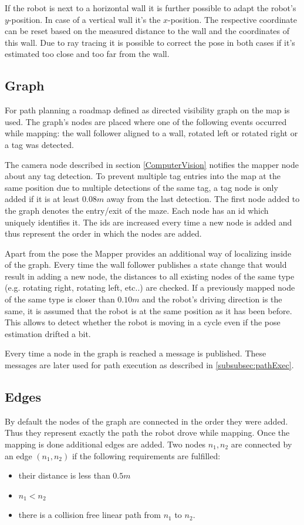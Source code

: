 If the robot is next to a horizontal wall it is further possible to adapt the robot's $y$-position. In case of a vertical wall it's the $x$-position.
The respective coordinate can be reset based on the measured distance to the wall and the coordinates of this wall. Due to ray tracing it is possible to correct the pose in both cases if it's estimated too close and too far from the wall. 

\subsection{Graph}

For path planning a roadmap defined as directed visibility graph on the map is used. The graph's nodes are placed where one of the following events occurred while mapping: the wall follower aligned to a wall, rotated left or rotated right or a tag was detected. 

The camera node described in section \ref{ComputerVision} notifies the mapper node about any tag detection. To prevent multiple tag entries into the map at the same position due to multiple detections of the same tag, a tag node is only added if it is at least $0.08m$ away from the last detection. 
The first node added to the graph denotes the entry/exit of the maze.
Each node has an id which uniquely identifies it. The ids are increased every time a new node is added and thus represent the order in which the nodes are added.

Apart from the pose the Mapper provides an additional way of localizing inside of the graph. Every time the wall follower publishes a state change that would result in adding a new node, the distances to all existing nodes of the same type (e.g. rotating right, rotating left, etc..) are checked.
If a previously mapped node of the same type is closer than $0.10m$ and the robot's driving direction is the same, it is assumed that the robot is at the same position as it has been before. This allows to detect whether the robot is moving in a cycle even if the pose estimation drifted a bit. 

Every time a node in the graph is reached a message is published. These messages are later used for path execution as described in \ref{subsubsec:pathExec}.

\subsection{Edges}

By default the nodes of the graph are connected in the order they were added. Thus they represent exactly the path the robot drove while mapping. Once the mapping is done additional edges are added. Two nodes $n_1,n_2$ are connected by an edge $(n_1,n_2)$ if the following requirements are fulfilled:
\begin{itemize}
 \item their distance is less than $0.5m$
 \item $n_1 < n_2$
 \item there is a collision free linear path from $n_1$ to $n_2$.
\end{itemize}

